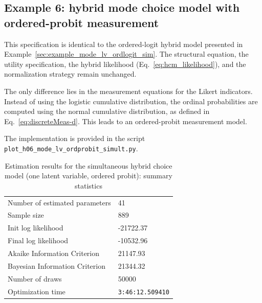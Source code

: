 \documentclass[12pt,a4paper]{article}
\let\OrigUnderscore\_
\def\_{\OrigUnderscore\penalty0\hspace{0pt}}%
\begin{document}
\FloatBarrier

\subsection{Example 6: hybrid mode choice model with ordered-probit measurement}
\label{sec:example_mode_lv_ordprobit_sim}

This specification is identical to the ordered-logit hybrid model
presented in Example~\ref{sec:example_mode_lv_ordlogit_sim}. The
structural equation, the utility specification, the hybrid likelihood
(Eq.~\eqref{eq:hcm_likelihood}), and the normalization strategy remain
unchanged.

The only difference lies in the measurement equations for the Likert
indicators. Instead of using the logistic cumulative distribution, the
ordinal probabilities are computed using the normal cumulative
distribution, as defined in Eq.~\eqref{eq:discreteMeas-d}. This leads
to an ordered-probit measurement model.

The implementation is provided in the script
\texttt{plot\_h06\_mode\_lv\_ordprobit\_simult.py}.

\begin{table}
  \small \ttfamily \centering
  \begin{tabular}{ll}
Number of estimated parameters & 41 \\
Sample size & 889 \\
Init log likelihood & -21722.37 \\
Final log likelihood & -10532.96 \\
Akaike Information Criterion & 21147.93 \\
Bayesian Information Criterion & 21344.32 \\
Number of draws & 50000 \\
Optimization time & \verb$3:46:12.509410$ \\
\end{tabular}
\caption{Estimation results for the simultaneous hybrid choice model
  (one latent variable, ordered probit): summary statistics}
\label{tab:example6_results_summary}
\end{table}
\end{document}
